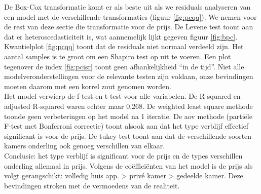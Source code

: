 \documentclass[a4paper,kulak]{kulakarticle} %
\begin{document}
De Box-Cox transformatie komt er als beste uit als we residuals analyseren van een model met de verschillende transformaties (figuur \ref{fig:pcqq}).
We nemen voor de rest van deze sectie die transformatie voor de prijs.
De Levene test toont aan dat er heteroscedasticiteit is, wat aannemelijk lijkt gegeven figuur \ref{fig:bpc}.
Kwantielplot \ref{fig:pcqq} toont dat de residuals niet normaal verdeeld zijn.
Het aantal samples is te groot om een Shapiro test op uit te voeren.
Een plot tegenover de index \ref{fig:pcisr} toont geen afhankelijkheid ``in de tijd''.
Niet alle modelveronderstellingen voor de relevante testen zijn voldaan, onze bevindingen moeten daarom met een korrel zout genomen worden.\\
Het model verwierp de f-test en t-test voor alle variabelen. 
De R-squared en adjusted R-squared  waren echter maar 0.268.
De weighted least square methode toonde geen verbeteringen op het model na 1 iteratie. 
De aov methode (partiële F-test met Bonferroni correctie) toont alsook aan dat het type verblijf effectief significant is voor de prijs.
De tukey-test toont aan dat de verschillende soorten kamers onderling ook genoeg verschillen van elkaar. \\
Conclusie: het type verblijf is significant voor de prijs en de types verschillen onderling allemaal in prijs. Volgens de coëfficiënten van het model is de prijs als volgt gerangschikt: 
volledig huis app. > privé kamer > gedeelde kamer.
Deze bevindingen stroken met de vermoedens van de realiteit.
\end{document}
